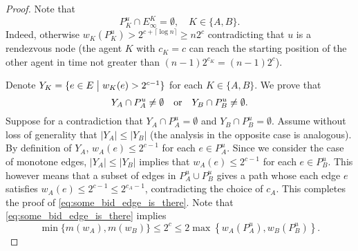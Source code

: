 \documentclass{llncs}
\newcommand{\agentVariable}{K}
\newcommand{\st}{\hspace{0.1cm}\bigl|\bigr.\hspace{0.1cm}}
\begin{document}
\begin{proof}
Note that
\begin{equation} \label{eq:no_big_edges}
P_{\agentVariable}^u\cap E_{\infty}^{\agentVariable} = \emptyset, \quad {\agentVariable}\in\{A,B\}.
\end{equation}
Indeed, otherwise $w_{\agentVariable}(P_{\agentVariable}^u)>2^{c+\lceil\log n\rceil}\geq n2^{c}$ contradicting that $u$ is a rendezvous node (the agent ${\agentVariable}$ with $c_{\agentVariable}=c$ can reach the starting position of the other agent in time not greater than 
$(n-1)2^{c_{\agentVariable}}=(n-1)2^{c}$).

Denote $Y_{\agentVariable}=\{e\in E \st w_{\agentVariable}(e)>2^{c-1}\}$ for each ${\agentVariable}\in\{A,B\}$.
We prove that
\begin{equation} \label{eq:some_bid_edge_is_there}
 Y_A\cap P_A^u\neq\emptyset \quad\textup{or}\quad Y_B\cap P_B^u\neq\emptyset.
\end{equation}
Suppose for a contradiction that $Y_A\cap P_A^u=\emptyset$ and $Y_B\cap P_B^u=\emptyset$.
Assume without loss of generality that $|Y_A|\leq|Y_B|$ (the analysis in the opposite case is analogous).
By definition of $Y_A$, $w_A(e)\leq 2^{c-1}$ for each $e\in P_A^u$.
Since we consider the case of monotone edges, $|Y_A|\leq|Y_B|$ implies that $w_A(e)\leq 2^{c-1}$ for each $e\in P_B^u$.
This however means that a subset of edges in $P_A^u\cup P_B^u$ gives a path whose each edge $e$ satisfies $w_A(e)\leq 2^{c-1}\leq 2^{c_A-1}$, contradicting the choice of $c_A$.
This completes the proof of \eqref{eq:some_bid_edge_is_there}.
Note that \eqref{eq:some_bid_edge_is_there} implies
\begin{equation} \label{eq:min:bound}
\min\{m(w_A),m(w_B)\} \leq 2^c \leq 2 \max\left\{ w_A(P_A^u),w_B(P_B^u) \right\}.
\end{equation}


\end{proof}
\end{document}
